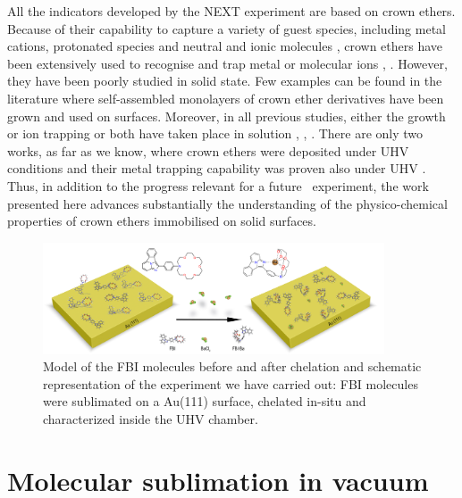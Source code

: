 \documentclass[aps,prl,reprint,longbibliography,superscriptaddress, english]{revtex4-1}
\begin{document}
All the indicators developed by the NEXT experiment are based on crown ethers. Because of their capability to capture a variety of guest species, including metal cations, protonated species and neutral and ionic molecules \cite{dobler1981ionophores}, crown ethers \cite{gokel_crown_1991} have been extensively used to recognise and trap metal or molecular ions \cite{more_intrinsic_1999}, \cite{maleknia_cavity-size-dependent_2002}. However, they have been poorly studied in solid state. Few examples can be found in the literature where self-assembled monolayers of crown ether derivatives have been grown and used on surfaces. Moreover, in all previous studies, either the growth or ion trapping or both have taken place in solution \cite{yoshimoto_hostguest_2003}, \cite{flink_recognition_1999}, \cite{inokuchi_new_2015}. 
 There are only two works, as far as we know, where crown ethers were deposited under UHV conditions \cite{feng_growth_2018} and their metal trapping capability was proven also under UHV \cite{stredansky_-surface_2019}. Thus, in addition to the progress relevant for a future \bbonu\ experiment, the work presented here advances substantially the understanding of the physico-chemical properties of crown ethers immobilised on solid surfaces. 
 

 \begin{figure}[ht!]
	\includegraphics[width=0.9\textwidth]{figures/figura_1a.jpg}
	\caption{\label{ModeloFBI} 
    Model of the FBI molecules before and after chelation and schematic representation of the experiment we have carried out: FBI molecules were sublimated on a Au(111) surface, chelated in-situ and characterized inside the UHV chamber.}
\end{figure}  


\section{Molecular sublimation in vacuum}
\end{document}
